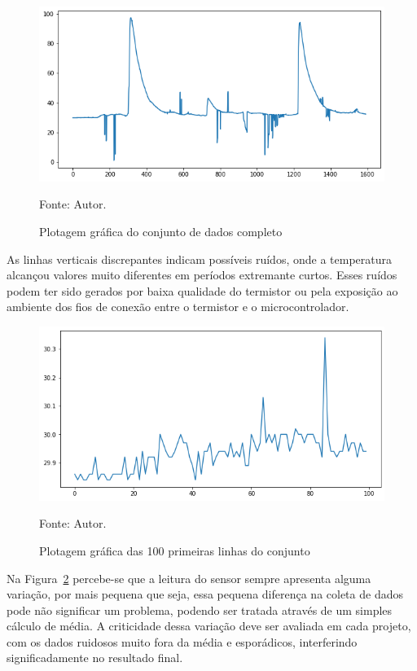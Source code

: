\begin{figure}[H]
	\centering
	\includegraphics[width=15cm]{imagens/sensores/bruto.png}
	\caption{Plotagem gráfica do conjunto de dados completo}
	Fonte: Autor.
	\label{fig: bruto}
\end{figure}

As linhas verticais discrepantes indicam possíveis ruídos, onde a temperatura alcançou valores muito diferentes em períodos extremante curtos. Esses ruídos podem ter sido gerados por baixa qualidade do termistor ou pela exposição ao ambiente dos fios de conexão entre o termistor e o microcontrolador.


\begin{figure}[H]
	\centering
	\includegraphics[width=15cm]{imagens/sensores/bruto_100_primeiras}
	\caption{Plotagem gráfica das 100 primeiras linhas do conjunto}
	Fonte: Autor.
	\label{fig: bruto_100p}
\end{figure}

Na Figura~\ref{fig: bruto_100p} percebe-se que a leitura do sensor sempre apresenta alguma variação, por mais pequena que seja, essa pequena diferença na coleta de dados pode não significar um problema, podendo ser tratada através de um simples cálculo de média. A criticidade dessa variação deve ser avaliada em cada projeto, com os dados ruidosos muito fora da média e esporádicos, interferindo significadamente no resultado final. 

